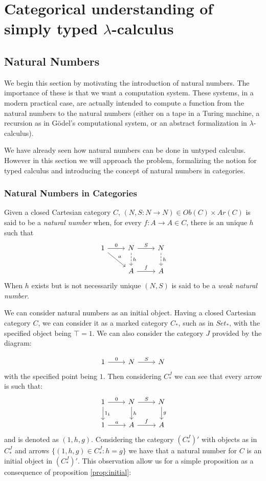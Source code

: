 \section{Categorical understanding of simply typed $\lambda$-calculus}
\subsection{Natural Numbers}


We begin this section by motivating the introduction of natural numbers. The importance of these is that we want a computation system. These systems, in a modern practical case, are actually intended to compute a function from the natural numbers to the natural numbers (either on a tape in a Turing machine, a recursion as in Gödel's computational system, or an abstract formalization in $\lambda$-calculus).

We have already seen how natural numbers can be done in untyped calculus. However in this section we will approach the problem, formalizing the notion for typed calculus and introducing the concept of natural numbers in categories.

\subsubsection{Natural Numbers in Categories}


\begin{definition}
  Given a closed Cartesian category $C$,  $(N,S:N\to N)\in Ob(C)\times Ar(C)$ is said to be a \emph{natural number} when, for every $f:A\to A\in C$, there is an unique $h$ such that
\[
  \begin{tikzcd}
    1\arrow{dr}{a}\arrow{r}{0} & N\arrow{r}{S}\arrow[dashed]{d}{h} & N\arrow[dashed]{d}{h}\\
    & A\arrow{r}{f} & A
  \end{tikzcd}
\]
When $h$ exists but is not necessarily unique $(N,S)$ is said to be a \emph{weak natural number}.
\end{definition}

We can consider natural numbers as an initial object. Having a closed Cartesian category $C$, we can consider it as a marked category $C_*$, such as in $Set_*$, with the specified object being $\top =1$. We can also consider the category $J$ provided by the diagram:

\[
  \begin{tikzcd}
    1\arrow{r}{0} & N\arrow{r}{S} & N
  \end{tikzcd}
\]
with the specified point being $1$. Then considering $C_*^J$ we can see that every arrow is such that: 
\[
  \begin{tikzcd}
    1\arrow{r}{0}\arrow{d}{1_1} & N\arrow{r}{S}\arrow{d}{h} & N\arrow{d}{g}\\
    1\arrow{r}{a} & A\arrow{r}{f} & A
  \end{tikzcd}
\]
and is denoted as $(1,h,g)$. Considering the category $(C_*^J)'$ with objects as in $C_*^J$ and arrows  $\{(1,h,g)\in C_*^J: h=g\}$ we have that a natural number for $C$ is an initial object in $(C_*^J)'$. This observation allow us for a simple proposition as a consequence of proposition \ref{prop:initial}:

